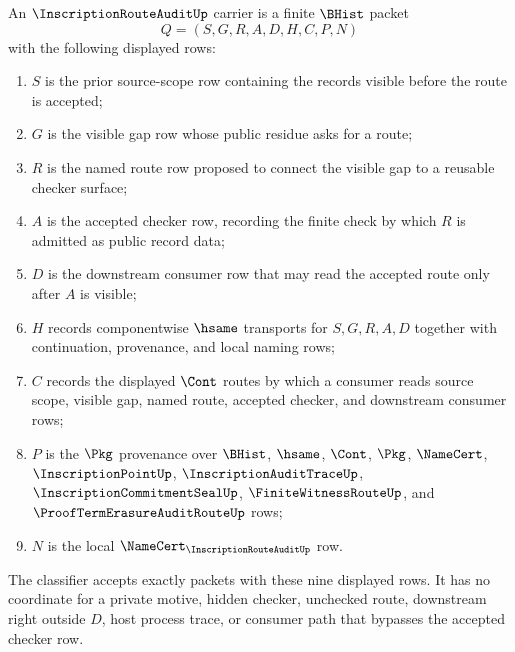\begin{definition}
\label{def:inscription-route-audit-carrier}
An $\InscriptionRouteAuditUp$ carrier is a finite $\BHist$ packet
$$
Q=(S,G,R,A,D,H,C,P,N)
$$
with the following displayed rows:
\begin{enumerate}
\item $S$ is the prior source-scope row containing the records visible before the route is accepted;
\item $G$ is the visible gap row whose public residue asks for a route;
\item $R$ is the named route row proposed to connect the visible gap to a reusable checker surface;
\item $A$ is the accepted checker row, recording the finite check by which $R$ is admitted as public record data;
\item $D$ is the downstream consumer row that may read the accepted route only after $A$ is visible;
\item $H$ records componentwise $\hsame$ transports for $S,G,R,A,D$ together with continuation, provenance, and local naming rows;
\item $C$ records the displayed $\Cont$ routes by which a consumer reads source scope, visible gap, named route, accepted checker, and downstream consumer rows;
\item $P$ is the $\Pkg$ provenance over $\BHist$, $\hsame$, $\Cont$, $\Pkg$, $\NameCert$, $\InscriptionPointUp$, $\InscriptionAuditTraceUp$, $\InscriptionCommitmentSealUp$, $\FiniteWitnessRouteUp$, and $\ProofTermErasureAuditRouteUp$ rows;
\item $N$ is the local $\NameCert_{\InscriptionRouteAuditUp}$ row.
\end{enumerate}
The classifier accepts exactly packets with these nine displayed rows. It has
no coordinate for a private motive, hidden checker, unchecked route, downstream
right outside $D$, host process trace, or consumer path that bypasses the
accepted checker row.
\end{definition}

